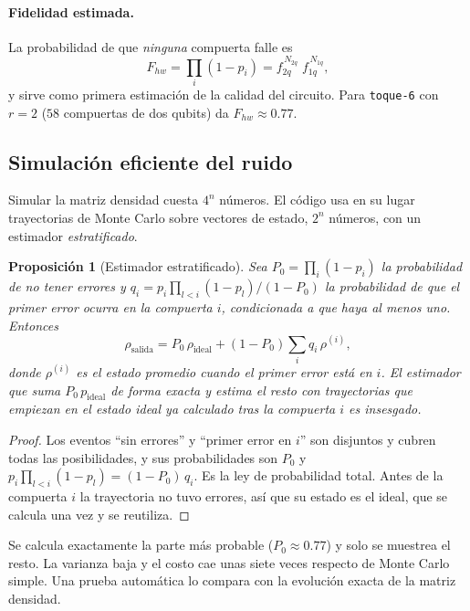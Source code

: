 \documentclass[11pt,a4paper]{article}
\newcommand{\code}[1]{\texttt{#1}}
\theoremstyle{plain}
\newtheorem{proposicion}{Proposición}[section]
\theoremstyle{definition}
\theoremstyle{remark}
\begin{document}
\paragraph{Fidelidad estimada.} La probabilidad de que \emph{ninguna} compuerta falle es
\begin{equation}
F_{hw}=\prod_i(1-p_i)=f_{2q}^{\,N_{2q}}\;f_{1q}^{\,N_{1q}},
\end{equation}
y sirve como primera estimación de la calidad del circuito. Para \code{toque-6} con $r=2$ ($58$ compuertas de dos qubits) da $F_{hw}\approx0.77$.

\subsection{Simulación eficiente del ruido}

Simular la matriz densidad cuesta $4^n$ números. El código usa en su lugar trayectorias de Monte Carlo sobre vectores de estado, $2^n$ números, con un estimador \emph{estratificado}.

\begin{proposicion}[Estimador estratificado]
Sea $P_0=\prod_i(1-p_i)$ la probabilidad de no tener errores y $q_i=p_i\prod_{l<i}(1-p_l)/(1-P_0)$ la probabilidad de que el \emph{primer} error ocurra en la compuerta $i$, condicionada a que haya al menos uno. Entonces
\begin{equation}
\rho_{\text{salida}} = P_0\,\rho_{\text{ideal}} + (1-P_0)\sum_iq_i\,\rho^{(i)},
\end{equation}
donde $\rho^{(i)}$ es el estado promedio cuando el primer error está en $i$. El estimador que suma $P_0\,p_{\text{ideal}}$ de forma exacta y estima el resto con trayectorias que empiezan en el estado ideal ya calculado tras la compuerta $i$ es insesgado.
\end{proposicion}

\begin{proof}
Los eventos ``sin errores'' y ``primer error en $i$'' son disjuntos y cubren todas las posibilidades, y sus probabilidades son $P_0$ y $p_i\prod_{l<i}(1-p_l)=(1-P_0)\,q_i$. Es la ley de probabilidad total. Antes de la compuerta $i$ la trayectoria no tuvo errores, así que su estado es el ideal, que se calcula una vez y se reutiliza.
\end{proof}

Se calcula exactamente la parte más probable ($P_0\approx0.77$) y solo se muestrea el resto. La varianza baja y el costo cae unas siete veces respecto de Monte Carlo simple. Una prueba automática lo compara con la evolución exacta de la matriz densidad.
\end{document}
